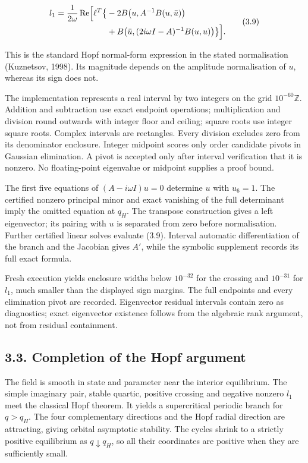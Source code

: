 \documentclass[
  11pt,
]{article}
\begin{document}
\[
\begin{aligned}
l_1=\frac1{2\omega}\operatorname{Re}\Bigl[\ell^T\bigl\{
&-2B\bigl(u,A^{-1}B(u,\bar u)\bigr)\\
&+B\bigl(\bar u,(2i\omega I-A)^{-1}B(u,u)\bigr)
\bigr\}\Bigr].
\end{aligned} \tag{3.9}
\]

This is the standard Hopf normal-form expression in the stated
normalisation (Kuznetsov, 1998). Its magnitude depends on the amplitude
normalisation of \(u\), whereas its sign does not.

The implementation represents a real interval by two integers on the
grid \(10^{-60}\mathbb Z\). Addition and subtraction use exact endpoint
operations; multiplication and division round outwards with integer
floor and ceiling; square roots use integer square roots. Complex
intervals are rectangles. Every division excludes zero from its
denominator enclosure. Integer midpoint scores only order candidate
pivots in Gaussian elimination. A pivot is accepted only after interval
verification that it is nonzero. No floating-point eigenvalue or
midpoint supplies a proof bound.

The first five equations of \((A-i\omega I)u=0\) determine \(u\) with
\(u_6=1\). The certified nonzero principal minor and exact vanishing of
the full determinant imply the omitted equation at \(q_H\). The
transpose construction gives a left eigenvector; its pairing with \(u\)
is separated from zero before normalisation. Further certified linear
solves evaluate (3.9). Interval automatic differentiation of the branch
and the Jacobian gives \(A'\), while the symbolic supplement records its
full exact formula.

Fresh execution yields enclosure widths below \(10^{-32}\) for the
crossing and \(10^{-31}\) for \(l_1\), much smaller than the displayed
sign margins. The full endpoints and every elimination pivot are
recorded. Eigenvector residual intervals contain zero as diagnostics;
exact eigenvector existence follows from the algebraic rank argument,
not from residual containment.

\subsection{3.3. Completion of the Hopf
argument}\label{completion-of-the-hopf-argument}

The field is smooth in state and parameter near the interior
equilibrium. The simple imaginary pair, stable quartic, positive
crossing and negative nonzero \(l_1\) meet the classical Hopf theorem.
It yields a supercritical periodic branch for \(q>q_H\). The four
complementary directions and the Hopf radial direction are attracting,
giving orbital asymptotic stability. The cycles shrink to a strictly
positive equilibrium as \(q\downarrow q_H\), so all their coordinates
are positive when they are sufficiently small.
\end{document}
